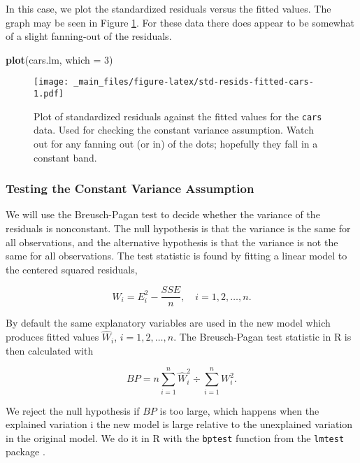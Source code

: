 \documentclass[]{book}
\newenvironment{Shaded}{\begin{snugshade}}{\end{snugshade}}
\newcommand{\KeywordTok}[1]{\textcolor[rgb]{0.13,0.29,0.53}{\textbf{{#1}}}}
\newcommand{\DataTypeTok}[1]{\textcolor[rgb]{0.13,0.29,0.53}{{#1}}}
\newcommand{\DecValTok}[1]{\textcolor[rgb]{0.00,0.00,0.81}{{#1}}}
\newcommand{\NormalTok}[1]{{#1}}
\numberwithin{equation}{chapter}
\numberwithin{figure}{chapter}
\theoremstyle{plain}
\theoremstyle{definition}
\theoremstyle{remark}
\theoremstyle{definition}
\theoremstyle{definition}
\theoremstyle{remark}
\begin{document}
In this case, we plot the standardized residuals versus the fitted
values. The graph may be seen in Figure
\ref{fig:std-resids-fitted-cars}. For these data there does appear to be
somewhat of a slight fanning-out of the residuals.

\begin{Shaded}
\begin{Highlighting}[]
\KeywordTok{plot}\NormalTok{(cars.lm, }\DataTypeTok{which =} \DecValTok{3}\NormalTok{)}
\end{Highlighting}
\end{Shaded}

\begin{figure}[htbp]
\centering
\texttt{[image: \_main\_files/figure-latex/std-resids-fitted-cars-1.pdf]}
\caption{\label{fig:std-resids-fitted-cars}\small Plot of standardized residuals
against the fitted values for the \texttt{cars} data. Used for checking
the constant variance assumption. Watch out for any fanning out (or in)
of the dots; hopefully they fall in a constant band.}
\end{figure}






\subsubsection{Testing the Constant Variance
Assumption}\label{testing-the-constant-variance-assumption}

We will use the Breusch-Pagan test to decide whether the variance of the
residuals is nonconstant. The null hypothesis is that the variance is
the same for all observations, and the alternative hypothesis is that
the variance is not the same for all observations. The test statistic is
found by fitting a linear model to the centered squared residuals,

\begin{equation}
W_{i} = E_{i}^{2} - \frac{SSE}{n}, \quad i=1,2,\ldots,n.
\end{equation}

By default the same explanatory variables are used in the new model
which produces fitted values \(\hat{W}_{i}\), \(i=1,2,\ldots,n\). The
Breusch-Pagan test statistic in R is then calculated with

\begin{equation}
BP=n\sum_{i=1}^{n}\hat{W}_{i}^{2}\div\sum_{i=1}^{n}W_{i}^{2}.
\end{equation}

We reject the null hypothesis if \(BP\) is too large, which happens when
the explained variation i the new model is large relative to the
unexplained variation in the original model. We do it in R with the
\texttt{bptest} function from the \texttt{lmtest} package
\autocite{lmtest}.
\end{document}

